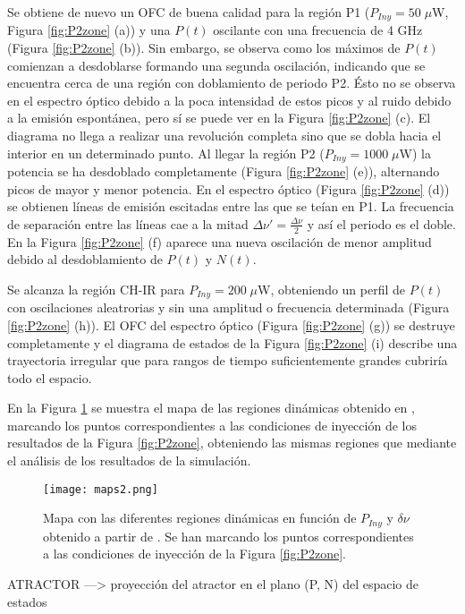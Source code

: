 		Se obtiene de nuevo un OFC de buena calidad para la región P1 ($P_{Iny} = 50\;\mu$W, Figura \ref{fig:P2zone} (a)) y una $P(t)$ oscilante con una frecuencia de 4 GHz (Figura \ref{fig:P2zone} (b)). Sin embargo, se observa como los máximos de $P(t)$ comienzan a desdoblarse formando una segunda oscilación, indicando que se encuentra cerca de una región con doblamiento de periodo P2. Ésto no se observa en el espectro óptico debido a la poca intensidad de estos picos y al ruido debido a la emisión espontánea, pero sí se puede ver en la Figura \ref{fig:P2zone} (c). El diagrama no llega a realizar una revolución completa sino que se dobla hacia el interior en un determinado punto. Al llegar la región P2 ($P_{Iny} = 1000\;\mu$W) la potencia se ha desdoblado completamente (Figura \ref{fig:P2zone} (e)), alternando picos de mayor y menor potencia. En el espectro óptico (Figura \ref{fig:P2zone} (d)) se obtienen líneas de emisión escitadas entre las que se teían en P1. La frecuencia de separación entre las líneas cae a la mitad $\Delta \nu' = \frac{\Delta\nu}{2}$ y así el periodo es el doble. En la Figura \ref{fig:P2zone} (f) aparece una nueva oscilación de menor amplitud debido al desdoblamiento de $P(t)$ y $N(t)$.

		Se alcanza la región CH-IR para $P_{Iny} = 200\;\mu$W, obteniendo un perfil de $P(t)$ con oscilaciones aleatrorias y sin una amplitud o frecuencia determinada (Figura \ref{fig:P2zone} (h)). El OFC del espectro óptico (Figura \ref{fig:P2zone} (g)) se destruye completamente y el diagrama de estados de la Figura \ref{fig:P2zone} (i) describe una trayectoria irregular que para rangos de tiempo suficientemente grandes cubriría todo el espacio. 

		En la Figura \ref{fig:maps2} se muestra el mapa de las regiones dinámicas obtenido en \cite{Chaves19}, marcando los puntos correspondientes a las condiciones de inyección de los resultados de la Figura \ref{fig:P2zone}, obteniendo las mismas regiones que mediante el análisis de los resultados de la simulación.

			\begin{figure}[H]
				\centering
				\texttt{[image: maps2.png]}
				\caption{\label{fig:maps2}Mapa con las diferentes regiones dinámicas en función de $P_{Iny}$ y $\delta\nu$ obtenido a partir de \cite{Chaves19}. Se han marcando los puntos correspondientes a las condiciones de inyección de la Figura \ref{fig:P2zone}.}	
			\end{figure}


ATRACTOR ---> proyección  del atractor en el plano (P, N) del espacio de estados